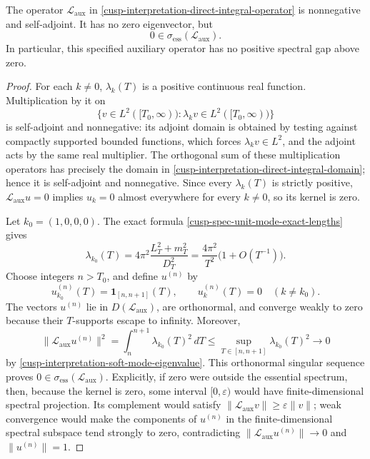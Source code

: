 \begin{theorem}
\label{cusp-interpretation-direct-integral-gapless}
The operator \(\mathscr L_{\mathrm{aux}}\) in
\cref{cusp-interpretation-direct-integral-operator} is nonnegative and
self-adjoint.  It has no zero eigenvector, but
\begin{equation}
 0\in\sigma_{\mathrm{ess}}(\mathscr L_{\mathrm{aux}}).
 \label{cusp-interpretation-zero-essential-spectrum}
\end{equation}
In particular, this specified auxiliary operator has no positive spectral
gap above zero.
\end{theorem}

\begin{proof}
For each \(k\ne0\), \(\lambda_k(T)\) is a positive continuous real function.
Multiplication by it on
\[
 \{v\in L^2([T_0,\infty)):\lambda_kv\in L^2([T_0,\infty))\}
\]
is self-adjoint and nonnegative: its adjoint domain is obtained by testing
against compactly supported bounded functions, which forces
\(\lambda_kv\in L^2\), and the adjoint acts by the same real multiplier.
The orthogonal sum of these multiplication operators has precisely the
domain in \cref{cusp-interpretation-direct-integral-domain}; hence it is
self-adjoint and nonnegative.  Since every \(\lambda_k(T)\) is strictly
positive, \(\mathscr L_{\mathrm{aux}}u=0\) implies \(u_k=0\) almost
everywhere for every \(k\ne0\), so its kernel is zero.

Let \(k_0=(1,0,0,0)\).  The exact formula
\cref{cusp-spec-unit-mode-exact-lengths} gives
\begin{equation}
 \lambda_{k_0}(T)
 =4\pi^2\frac{L_T^2+m_T^2}{D_T^2}
 =\frac{4\pi^2}{T^2}\bigl(1+O(T^{-1})\bigr).
 \label{cusp-interpretation-soft-mode-eigenvalue}
\end{equation}
Choose integers \(n>T_0\), and define \(u^{(n)}\) by
\begin{equation}
 u^{(n)}_{k_0}(T)=\mathbf1_{[n,n+1]}(T),
 \qquad u^{(n)}_k(T)=0\quad(k\ne k_0).
 \label{cusp-interpretation-Weyl-sequence}
\end{equation}
The vectors \(u^{(n)}\) lie in
\(D(\mathscr L_{\mathrm{aux}})\), are orthonormal, and converge weakly to
zero because their \(T\)-supports escape to infinity.  Moreover,
\[
 \lVert\mathscr L_{\mathrm{aux}}u^{(n)}\rVert^2
 =\int_n^{n+1}\lambda_{k_0}(T)^2\,dT
 \le\sup_{T\in[n,n+1]}\lambda_{k_0}(T)^2
 \longrightarrow0
\]
by \cref{cusp-interpretation-soft-mode-eigenvalue}.  This orthonormal
singular sequence proves
\(0\in\sigma_{\mathrm{ess}}(\mathscr L_{\mathrm{aux}})\).  Explicitly, if
zero were outside the essential spectrum, then, because the kernel is zero,
some interval \([0,\varepsilon)\) would have finite-dimensional spectral
projection.  Its complement would satisfy
\(\lVert\mathscr L_{\mathrm{aux}}v\rVert\ge
\varepsilon\lVert v\rVert\); weak convergence would make the components of
\(u^{(n)}\) in the finite-dimensional spectral subspace tend strongly to
zero, contradicting
\(\lVert\mathscr L_{\mathrm{aux}}u^{(n)}\rVert\to0\) and
\(\lVert u^{(n)}\rVert=1\).
\end{proof}

